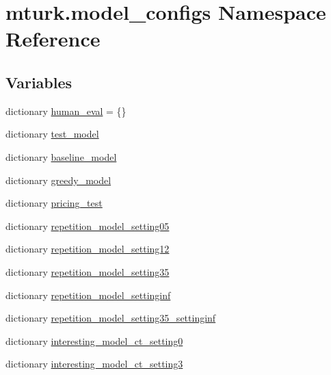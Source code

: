 \hypertarget{namespacemturk_1_1model__configs}{}\section{mturk.\+model\+\_\+configs Namespace Reference}
\label{namespacemturk_1_1model__configs}
\subsection*{Variables}
\begin{DoxyCompactItemize}
\item 
dictionary \hyperlink{namespacemturk_1_1model__configs_ab4931ca04682f283e38da749409fa41c}{human\+\_\+eval} = \{\}
\item 
dictionary \hyperlink{namespacemturk_1_1model__configs_a7c452427f1efdf487b85b26dbd55b422}{test\+\_\+model}
\item 
dictionary \hyperlink{namespacemturk_1_1model__configs_af563a384669a12e625c10788bdeb6e3c}{baseline\+\_\+model}
\item 
dictionary \hyperlink{namespacemturk_1_1model__configs_a85bd1dcb565bb2ca8c6c0e7f326e350e}{greedy\+\_\+model}
\item 
dictionary \hyperlink{namespacemturk_1_1model__configs_a3cb0a191bf2dc8f0372d5b1ce844a5bc}{pricing\+\_\+test}
\item 
dictionary \hyperlink{namespacemturk_1_1model__configs_ac71e65f06950b79f61eb0eac2808fda6}{repetition\+\_\+model\+\_\+setting05}
\item 
dictionary \hyperlink{namespacemturk_1_1model__configs_aa88dbb7d6eee67682b8ba88f90af2012}{repetition\+\_\+model\+\_\+setting12}
\item 
dictionary \hyperlink{namespacemturk_1_1model__configs_a5af85bdfecc335b56ed3399d5aa82709}{repetition\+\_\+model\+\_\+setting35}
\item 
dictionary \hyperlink{namespacemturk_1_1model__configs_a92226cc19426c2690d7b7e5caaf0673d}{repetition\+\_\+model\+\_\+settinginf}
\item 
dictionary \hyperlink{namespacemturk_1_1model__configs_a87a00f4205e0049773d34284a4a10de2}{repetition\+\_\+model\+\_\+setting35\+\_\+settinginf}
\item 
dictionary \hyperlink{namespacemturk_1_1model__configs_a145826b5c5d2a7e0cb7255e0182a2033}{interesting\+\_\+model\+\_\+ct\+\_\+setting0}
\item 
dictionary \hyperlink{namespacemturk_1_1model__configs_a173639b5e1dfaf1d8ade8c6ba4b9bfc4}{interesting\+\_\+model\+\_\+ct\+\_\+setting3}

\end{DoxyCompactItemize}
